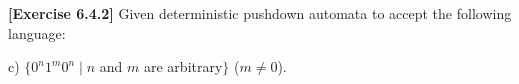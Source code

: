 \textbf{[Exercise 6.4.2]} Given deterministic pushdown automata to
accept the following language:

c) $\{0^n1^m0^n \mid n$ and $m$ are arbitrary$\}$ ($m\neq 0$).